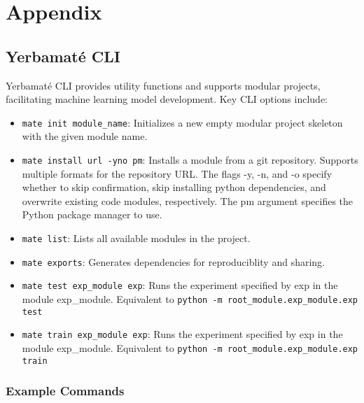 

\onecolumn

\section{Appendix}\label{appendix}



\subsection{Yerbamaté CLI}\label{CLIApp}

Yerbamaté CLI provides utility functions and supports modular projects, facilitating machine learning model development. Key CLI options include:

\begin{itemize}
\item \texttt{mate init module\_name}: Initializes a new empty modular project skeleton with the given module name. 

\item \texttt{mate install url -y\textbar n\textbar o pm}: Installs a module from a git repository. Supports multiple formats for the repository URL. The flags -y, -n, and -o specify whether to skip confirmation, skip installing python dependencies, and overwrite existing code modules, respectively. The pm argument specifies the Python package manager to use.
\item \texttt{mate list}: Lists all available modules in the project. 
\item \texttt{mate exports}: Generates dependencies for reproduciblity and sharing.
\item \texttt{mate test exp\_module exp}: Runs the experiment specified by exp in the module exp\_module. Equivalent to \texttt{python -m root\_module.exp\_module.exp test}
\item \texttt{mate train exp\_module exp}: Runs the experiment specified by exp in the module exp\_module. Equivalent to \texttt{python -m root\_module.exp\_module.exp train}
\end{itemize}

\subsubsection{Example Commands}


